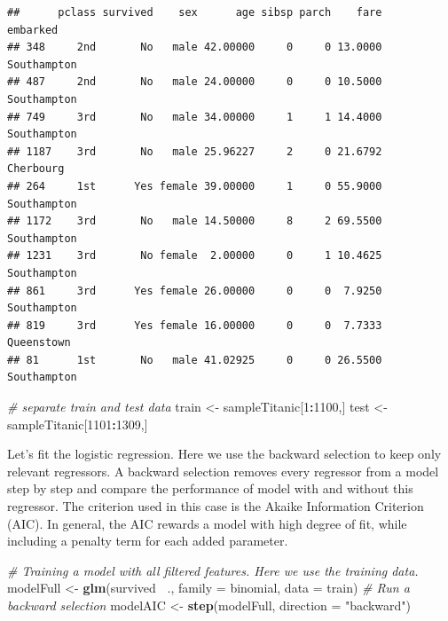 \documentclass[12,]{article}
\newenvironment{Shaded}{\begin{snugshade}}{\end{snugshade}}
\newcommand{\KeywordTok}[1]{\textcolor[rgb]{0.13,0.29,0.53}{\textbf{#1}}}
\newcommand{\DataTypeTok}[1]{\textcolor[rgb]{0.13,0.29,0.53}{#1}}
\newcommand{\DecValTok}[1]{\textcolor[rgb]{0.00,0.00,0.81}{#1}}
\newcommand{\StringTok}[1]{\textcolor[rgb]{0.31,0.60,0.02}{#1}}
\newcommand{\CommentTok}[1]{\textcolor[rgb]{0.56,0.35,0.01}{\textit{#1}}}
\newcommand{\OperatorTok}[1]{\textcolor[rgb]{0.81,0.36,0.00}{\textbf{#1}}}
\newcommand{\NormalTok}[1]{#1}
\begin{document}
\begin{verbatim}
##      pclass survived    sex      age sibsp parch    fare    embarked
## 348     2nd       No   male 42.00000     0     0 13.0000 Southampton
## 487     2nd       No   male 24.00000     0     0 10.5000 Southampton
## 749     3rd       No   male 34.00000     1     1 14.4000 Southampton
## 1187    3rd       No   male 25.96227     2     0 21.6792   Cherbourg
## 264     1st      Yes female 39.00000     1     0 55.9000 Southampton
## 1172    3rd       No   male 14.50000     8     2 69.5500 Southampton
## 1231    3rd       No female  2.00000     0     1 10.4625 Southampton
## 861     3rd      Yes female 26.00000     0     0  7.9250 Southampton
## 819     3rd      Yes female 16.00000     0     0  7.7333  Queenstown
## 81      1st       No   male 41.02925     0     0 26.5500 Southampton
\end{verbatim}

\begin{Shaded}
\begin{Highlighting}[]
\CommentTok{# separate train and test data}
\NormalTok{train <-}\StringTok{ }\NormalTok{sampleTitanic[}\DecValTok{1}\OperatorTok{:}\DecValTok{1100}\NormalTok{,]}
\NormalTok{test <-}\StringTok{ }\NormalTok{sampleTitanic[}\DecValTok{1101}\OperatorTok{:}\DecValTok{1309}\NormalTok{,] }
\end{Highlighting}
\end{Shaded}

Let's fit the logistic regression. Here we use the backward selection to
keep only relevant regressors. A backward selection removes every
regressor from a model step by step and compare the performance of model
with and without this regressor. The criterion used in this case is the
Akaike Information Criterion (AIC). In general, the AIC rewards a model
with high degree of fit, while including a penalty term for each added
parameter.

\begin{Shaded}
\begin{Highlighting}[]
  \CommentTok{# Training a model with all filtered features. Here we use the training data.}
\NormalTok{modelFull <-}\StringTok{ }\KeywordTok{glm}\NormalTok{(survived }\OperatorTok{~}\NormalTok{., }\DataTypeTok{family =}\NormalTok{ binomial, }\DataTypeTok{data =}\NormalTok{ train) }
  \CommentTok{# Run a backward selection}
\NormalTok{modelAIC <-}\StringTok{ }\KeywordTok{step}\NormalTok{(modelFull, }\DataTypeTok{direction =} \StringTok{"backward"}\NormalTok{)}
\end{Highlighting}
\end{Shaded}
\end{document}
